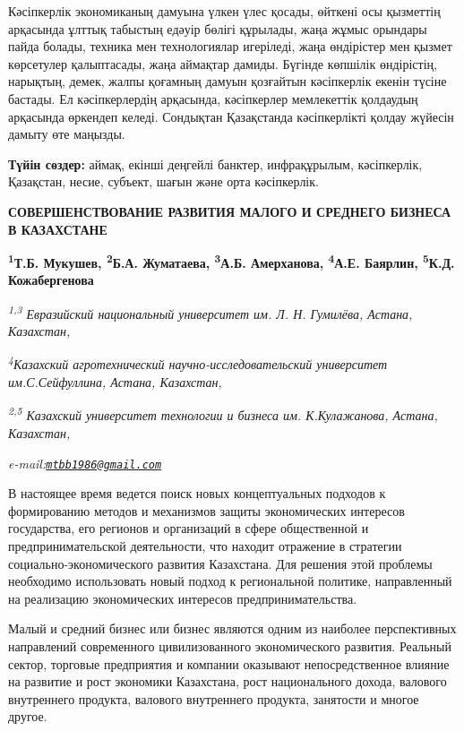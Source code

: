 Кәсіпкерлік экономиканың дамуына үлкен үлес қосады, өйткені осы
қызметтің арқасында ұлттық табыстың едәуір бөлігі құрылады, жаңа жұмыс
орындары пайда болады, техника мен технологиялар игеріледі, жаңа
өндірістер мен қызмет көрсетулер қалыптасады, жаңа аймақтар дамиды.
Бүгінде көпшілік өндірістің, нарықтың, демек, жалпы қоғамның дамуын
қозғайтын кәсіпкерлік екенін түсіне бастады. Ел кәсіпкерлердің
арқасында, кәсіпкерлер мемлекеттік қолдаудың арқасында өркендеп келеді.
Сондықтан Қазақстанда кәсіпкерлікті қолдау жүйесін дамыту өте маңызды.

{\bfseries Түйін сөздер:} аймақ, екінші деңгейлі банктер, инфрақұрылым,
кәсіпкерлік, Қазақстан, несие, субъект, шағын және орта кәсіпкерлік.

\begin{articleheader}
{\bfseries СОВЕРШЕНСТВОВАНИЕ РАЗВИТИЯ МАЛОГО И СРЕДНЕГО БИЗНЕСА В КАЗАХСТАНЕ}

{\bfseries
\textsuperscript{1}Т.Б. Мукушев\textsuperscript{\envelope },
\textsuperscript{2}Б.А. Жуматаева,
\textsuperscript{3}А.Б. Амерханова,
\textsuperscript{4}А.Е. Баярлин,
\textsuperscript{5}К.Д. Кожабергенова}
\end{articleheader}

\begin{affiliation}
\emph{\textsuperscript{1,3} Евразийский национальный университет им. Л. Н. Гумилёва, Астана, Казахстан,}

\emph{\textsuperscript{4}Казахский агротехнический научно-исследовательский университет им.С.Сейфуллина, Астана, Казахстан,}

\emph{\textsuperscript{2,5} Казахский университет технологии и бизнеса им. К.Кулажанова, Астана, Казахстан,}

\raggedright \emph{e-mail:\href{mailto:mtbb1986@gmail.com}{\nolinkurl{mtbb1986@gmail.com}}}
\end{affiliation}

В настоящее время ведется поиск новых концептуальных подходов к
формированию методов и механизмов защиты экономических интересов
государства, его регионов и организаций в сфере общественной и
предпринимательской деятельности, что находит отражение в стратегии
социально-экономического развития Казахстана. Для решения этой проблемы
необходимо использовать новый подход к региональной политике,
направленный на реализацию экономических интересов предпринимательства.

Малый и средний бизнес или бизнес являются одним из наиболее
перспективных направлений современного цивилизованного экономического
развития. Реальный сектор, торговые предприятия и компании оказывают
непосредственное влияние на развитие и рост экономики Казахстана, рост
национального дохода, валового внутреннего продукта, валового
внутреннего продукта, занятости и многое другое.

